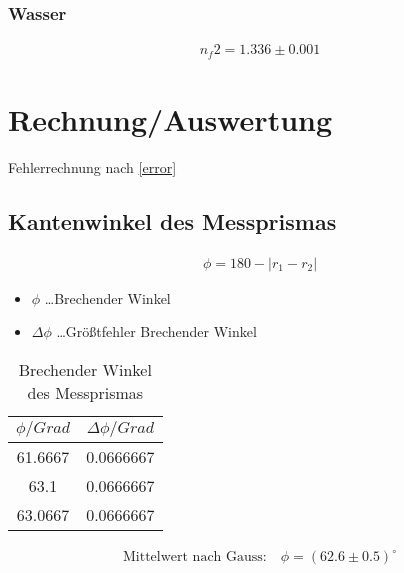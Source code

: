 \documentclass[a4paper]{article}
\begin{document}
\subsubsection{Wasser}
\begin{align}
	n_f2=1.336\pm 0.001				
\end{align}

\section{Rechnung/Auswertung}
Fehlerrechnung nach \ref{error}
\subsection{Kantenwinkel des Messprismas}
\begin{align}
 \phi = 180-\left| r_1-r_2 \right|
\end{align}
\begin{table}[ht]
				\centering
				\caption{Brechender Winkel des Messprismas}
				\begin{itemize}
								\item $\phi$ \dots Brechender Winkel
								\item $\Delta \phi$ \dots Größtfehler Brechender Winkel
				\end{itemize}
				\begin{tabular}{|c|c|}\hline
					$\phi/Grad$&$\Delta \phi/Grad$\\\hline
				 61.6667 & 0.0666667 \\\hline
				 63.1 & 0.0666667 \\\hline
				 63.0667 & 0.0666667\\\hline
				\end{tabular}
				\label{tab:brech}
\end{table}
\begin{align}
				\text{Mittelwert nach Gauss:}\quad
	\phi = (62.6 \pm 0.5)^\circ
\end{align}
\end{document}
